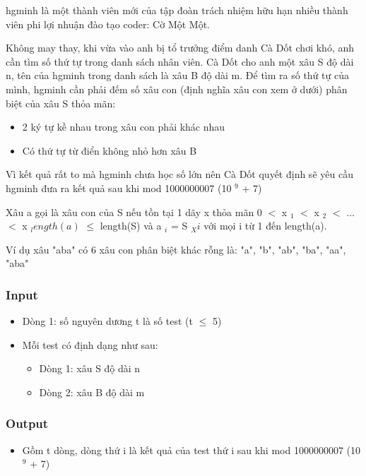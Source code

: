 



   hgminh là một thành viên mới của tập đoàn trách nhiệm hữu hạn nhiều thành viên phi lợi nhuận đào tạo coder: Cờ Một Một.  

   Không may thay, khi vừa vào anh bị tổ trưởng điểm danh Cà Dốt chơi khó, anh cần tìm số thứ tự trong danh sách nhân viên. Cà Dốt cho anh một xâu S độ dài n, tên của hgminh trong danh sách là xâu B độ dài m. Để tìm ra số thứ tự của mình, hgminh cần phải đếm số xâu con (định nghĩa xâu con xem ở dưới) phân biệt của xâu S thỏa mãn:  
\begin{itemize}
	\item     2 ký tự kề nhau trong xâu con phải khác nhau   
	\item     Có thứ tự từ điển không nhỏ hơn xâu B   
\end{itemize}

   Vì kết quả rất to mà hgminh chưa học số lớn nên Cà Dốt quyết định sẽ yêu cầu hgminh đưa ra kết quả sau khi mod 1000000007 (10   $^    9   $   + 7)  



   Xâu a gọi là xâu con của S nếu tồn tại 1 dãy x thỏa mãn 0 $<$ x   $_    1   $   $<$ x   $_    2   $   $<$ ...$<$ x   $_    length(a)   $    $\le$  length(S) và a   $_    i   $   = S   $_    Xi   $   với mọi i từ 1 đến length(a).  

   Ví dụ xâu "aba" có 6 xâu con phân biệt khác rỗng là: "a", "b", "ab", "ba", "aa", "aba"  



\subsubsection{   Input  }
\begin{itemize}
	\item     Dòng 1: số nguyên dương t là số test (t  $\le$  5)   
	\item     Mỗi test có định dạng như sau:    
\begin{itemize}
	\item       Dòng 1: xâu S độ dài n     
	\item       Dòng 2: xâu B độ dài m     
\end{itemize}
\end{itemize}

\subsubsection{   Output  }
\begin{itemize}
	\item     Gồm t dòng, dòng thứ i là kết quả của test thứ i sau khi mod 1000000007 (10    $^     9    $    + 7)   
\end{itemize}



